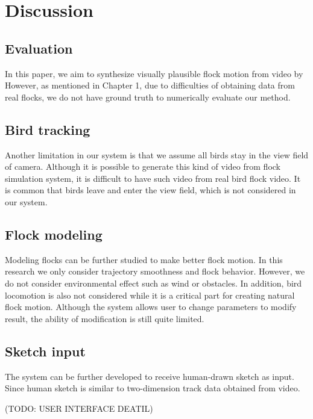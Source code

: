 \chapter{Discussion}


\section{Evaluation}


In this paper, we aim to synthesize visually plausible flock motion from video by However, as mentioned in Chapter 1, due to difficulties of obtaining data from real flocks, we do not have ground truth to numerically evaluate our method.


\section{Bird tracking}


Another limitation in our system is that we assume all birds stay in the view field of camera. Although it is possible to generate this kind of video from flock simulation system, it is difficult to have such video from real bird flock video. It is common that birds leave and enter the view field, which is not considered in our system. 


\section{Flock modeling}


Modeling flocks can be further studied to make better flock motion. In this research we only consider trajectory smoothness and flock behavior. However, we do not consider environmental effect such as wind or obstacles. In addition, bird locomotion is also not considered while it is a critical part for creating natural flock motion. 
Although the system allows user to change parameters to modify result, the ability of modification is still quite limited. 


\section{Sketch input}


The system can be further developed to receive human-drawn sketch as input. Since human sketch is similar to two-dimension track data obtained from video.


(TODO: USER INTERFACE DEATIL)
